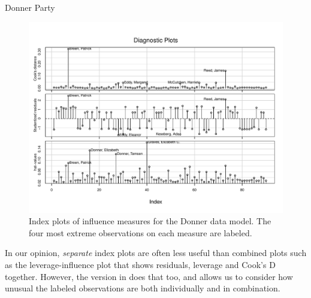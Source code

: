 \documentclass[11pt]{book}\usepackage[]{graphicx}\usepackage[]{color}
\newenvironment{knitrout}{}{} %
\renewenvironment{knitrout}{\small\renewcommand{\baselinestretch}{.85}}{} %
\begin{document}
\begin{Example}[donner2]{Donner Party}
\begin{knitrout}
\begin{figure}[!htbp]
\centerline{\includegraphics[width=.8\textwidth]{ch07/fig/donner2-indexinfl-1} }

\caption[Index plots of influence measures for the Donner data model]{Index plots of influence measures for the Donner data model. The four most extreme observations on each measure are labeled.\label{fig:donner2-indexinfl}}
\end{figure}


\end{knitrout}
In our opinion, \emph{separate} index plots are often less useful than combined plots such as
the leverage-influence plot that shows residuals, leverage and Cook's D together.
However, the  version in 
does that too, and allows us to consider how unusual the labeled observations are both individually and in combination.

\end{Example}
\end{document}
